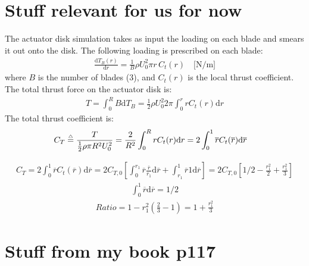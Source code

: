 \documentclass[11pt]{article}
\renewcommand{\d}{\mathrm{d}}
\newcommand{\dr}{{\d}r}
\newcommand{\dT}{{\d}T}
\newcommand{\eqdef}{\stackrel{\mathsmaller{\mathsmaller{\mathsmaller{\triangle}}}}{=}}
\begin{document}
\section{Stuff relevant for us for now}
The actuator disk simulation takes as input the loading on each blade and smears it out onto the disk. The following loading is prescribed on each blade:
\begin{align}
\frac{\dT_B(r)}{\dr} = \frac{1}{B}\rho U_0^2 \pi r \,C_t(r) \quad \text{[N/m]}
\end{align}
where $B$ is the number of blades (3), and $C_t(r)$ is the local thrust coefficient.
% 
The total thrust force on the actuator disk is:
\begin{align}
    T = \int_0^R B\dT_B = \frac{1}{2} \rho U_0^2 2\pi \int_0^r r C_t(r) \dr
\end{align}
The total thrust coefficient is:
\begin{align}
C_{T}&\eqdef \frac{T}{\frac{1}{2} \rho \pi R^2 U_0^2}
= \frac{2}{R^2} \int_0^R  r C_t(r) \dr = 2 \int_0^1 \overline{r} C_t(\overline{r}) {\d}\overline{r}
% 
\end{align}

\begin{align}
C_{T} = 2\int_0^1 \overline{r} C_t(\overline{r}) {\d}\overline{r}
 = 2 C_{T,0}\left[ \int_0^{r_1} \overline{r} \frac{\overline{r}}{r_1}   {\d}\overline{r}
 +\int_{r_1}^{1} \overline{r} 1  {\d}\overline{r} \right] 
 = 2 C_{T,0}\left[1/2-\frac{r_1^2}{2}+\frac{r_1^2}{3} \right]
% 
\end{align}
\begin{align}
 \int_0^1 \overline{r} {\d}\overline{r}
 =1/2
\end{align}
\begin{align}
Ratio =  1-r_1^2\left(\frac{2}{3}-1\right)
      =  1+\frac{r_1^2}{3}
\end{align}


\section{Stuff from my book p117}
\end{document}
